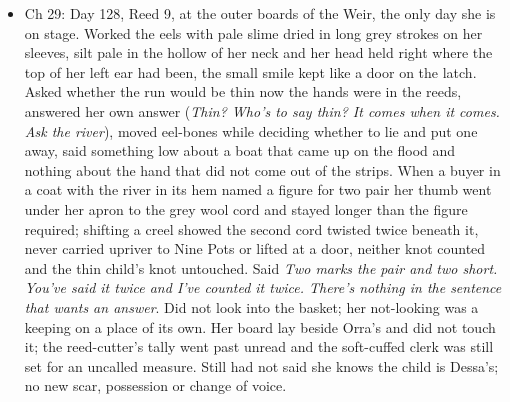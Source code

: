 \documentclass{design/chronicle}
\begin{document}
{\begin{itemize}[leftmargin=1.4em,itemsep=1pt,topsep=3pt,parsep=0pt]
\end{itemize}

\begin{itemize}[leftmargin=1.4em,itemsep=1pt,topsep=3pt,parsep=0pt]

\item Ch 29: Day 128, Reed 9, at the outer boards of the Weir, the only day she is on stage. Worked the eels with pale slime dried in long grey strokes on her sleeves, silt pale in the hollow of her neck and her head held right where the top of her left ear had been, the small smile kept like a door on the latch. Asked whether the run would be thin now the hands were in the reeds, answered her own answer (\emph{Thin? Who’s to say thin? It comes when it comes. Ask the river}), moved eel-bones while deciding whether to lie and put one away, said something low about a boat that came up on the flood and nothing about the hand that did not come out of the strips. When a buyer in a coat with the river in its hem named a figure for two pair her thumb went under her apron to the grey wool cord and stayed longer than the figure required; shifting a creel showed the second cord twisted twice beneath it, never carried upriver to Nine Pots or lifted at a door, neither knot counted and the thin child’s knot untouched. Said \emph{Two marks the pair and two short. You’ve said it twice and I’ve counted it twice. There’s nothing in the sentence that wants an answer}. Did not look into the basket; her not-looking was a keeping on a place of its own. Her board lay beside Orra’s and did not touch it; the reed-cutter’s tally went past unread and the soft-cuffed clerk was still set for an uncalled measure. Still had not said she knows the child is Dessa’s; no new scar, possession or change of voice.

\end{itemize}
}
\end{document}
